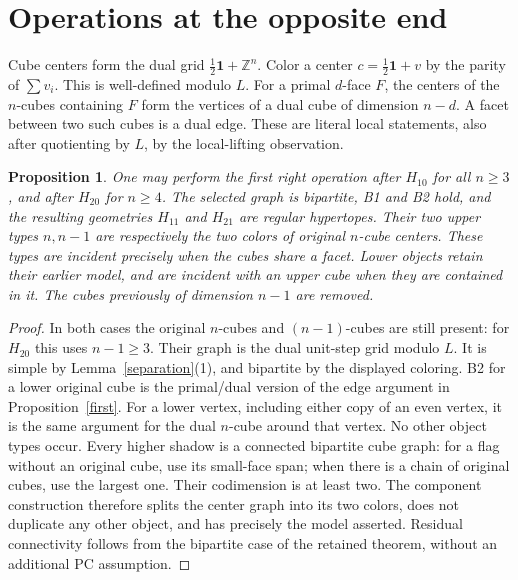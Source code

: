 \documentclass[11pt,a4paper]{article}
\newtheorem{proposition}[theorem]{Proposition}
\newcommand{\Z}{\mathbb Z}
\newcommand{\one}{\mathbf1}
\begin{document}
\section{Operations at the opposite end}
Cube centers form the dual grid $\frac12\one+\Z^n$. Color a
center $c=\frac12\one+v$ by the parity of $\sum v_i$.
This is well-defined modulo $L$. For a primal $d$-face $F$, the
centers of the $n$-cubes containing $F$ form the vertices of a
dual cube of dimension $n-d$. A facet between two such cubes
is a dual edge. These are literal local statements, also after
quotienting by $L$, by the local-lifting observation.

\begin{proposition}\label{oppositefirst}
One may perform the first right operation after $H_{10}$ for all
$n\ge3$, and after $H_{20}$ for $n\ge4$. The selected graph is
bipartite, B1 and B2 hold, and the resulting geometries $H_{11}$
and $H_{21}$ are regular hypertopes.
Their two upper types $n,n-1$ are respectively the two colors of
original $n$-cube centers. These types are incident precisely when
the cubes share a facet. Lower objects retain their earlier model,
and are incident with an upper cube when they are contained in it.
The cubes previously of dimension $n-1$ are removed.
\end{proposition}
\begin{proof}
In both cases the original $n$-cubes and $(n-1)$-cubes are still
present: for $H_{20}$ this uses $n-1\ge3$. Their graph is the
dual unit-step grid modulo $L$. It is simple by
Lemma~\ref{separation}(1), and bipartite by the displayed coloring.
B2 for a lower original cube is the primal/dual version of the
edge argument in Proposition~\ref{first}. For a lower vertex,
including either copy of an even vertex, it is the same argument
for the dual $n$-cube around that vertex. No other object types
occur. Every higher shadow is a connected bipartite cube graph:
for a flag without an original cube, use its small-face span;
when there is a chain of original cubes, use the largest one.
Their codimension is at least two. The component construction
therefore splits the center graph into its two colors, does not
duplicate any other object, and has precisely the model asserted.
Residual connectivity follows from the bipartite case of the
retained theorem, without an additional PC assumption.
\end{proof}
\end{document}
